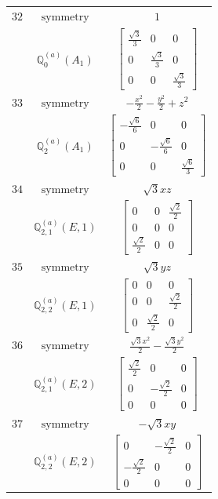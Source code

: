 \documentclass[fleqn,8pt,landscape]{jsarticle}
\begin{document}
\begin{longtable}{ccc}
$ 32 $ & $ \text{symmetry} $ & $ 1 $ \\
$  $ & $ \mathbb{Q}_{0}^{(a)}(A_{1}) $ & $ \begin{bmatrix} \frac{\sqrt{3}}{3} & 0 & 0 \\ 0 & \frac{\sqrt{3}}{3} & 0 \\ 0 & 0 & \frac{\sqrt{3}}{3} \end{bmatrix} $ \\ \hline
$ 33 $ & $ \text{symmetry} $ & $ - \frac{x^{2}}{2} - \frac{y^{2}}{2} + z^{2} $ \\
$  $ & $ \mathbb{Q}_{2}^{(a)}(A_{1}) $ & $ \begin{bmatrix} - \frac{\sqrt{6}}{6} & 0 & 0 \\ 0 & - \frac{\sqrt{6}}{6} & 0 \\ 0 & 0 & \frac{\sqrt{6}}{3} \end{bmatrix} $ \\ \hline
$ 34 $ & $ \text{symmetry} $ & $ \sqrt{3} x z $ \\
$  $ & $ \mathbb{Q}_{2,1}^{(a)}(E,1) $ & $ \begin{bmatrix} 0 & 0 & \frac{\sqrt{2}}{2} \\ 0 & 0 & 0 \\ \frac{\sqrt{2}}{2} & 0 & 0 \end{bmatrix} $ \\ \hline
$ 35 $ & $ \text{symmetry} $ & $ \sqrt{3} y z $ \\
$  $ & $ \mathbb{Q}_{2,2}^{(a)}(E,1) $ & $ \begin{bmatrix} 0 & 0 & 0 \\ 0 & 0 & \frac{\sqrt{2}}{2} \\ 0 & \frac{\sqrt{2}}{2} & 0 \end{bmatrix} $ \\ \hline
$ 36 $ & $ \text{symmetry} $ & $ \frac{\sqrt{3} x^{2}}{2} - \frac{\sqrt{3} y^{2}}{2} $ \\
$  $ & $ \mathbb{Q}_{2,1}^{(a)}(E,2) $ & $ \begin{bmatrix} \frac{\sqrt{2}}{2} & 0 & 0 \\ 0 & - \frac{\sqrt{2}}{2} & 0 \\ 0 & 0 & 0 \end{bmatrix} $ \\ \hline
$ 37 $ & $ \text{symmetry} $ & $ - \sqrt{3} x y $ \\
$  $ & $ \mathbb{Q}_{2,2}^{(a)}(E,2) $ & $ \begin{bmatrix} 0 & - \frac{\sqrt{2}}{2} & 0 \\ - \frac{\sqrt{2}}{2} & 0 & 0 \\ 0 & 0 & 0 \end{bmatrix} $ \\ \hline

\end{longtable}
\end{document}
